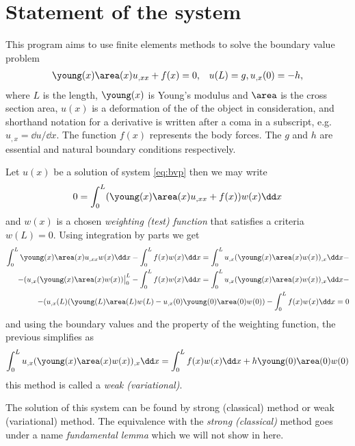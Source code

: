 \documentclass[twoside,a4paper,12pt]{article}
\newcommand{\+}[2]{\newcommand#1{{\color{\notcolor}#2}}}
\newcommand{\1}[2]{\newcommand{#1}[1]{{\color{\notcolor}#2}}}
\newcommand{\2}[2]{\newcommand{#1}[2]{{\color{\notcolor}#2}}}
\begin{document}
\section{Statement of the system}

This program aims to use finite elements methods to solve the boundary
value problem
%
\begin{align}
  \young(x) \area(x) u_{,xx} + f(x) = 0, \label{eq:bvp}
  &&u(L) = g, u_{,x}(0) = -h,
\end{align}
where $L$ is the length, $\young(x)$ is Young's modulus and $\area$ is
the cross section area, $u(x)$ is a deformation of the of the object
in consideration, and shorthand notation for a derivative is written
after a coma in a subscript, e.g. $u_{,x} = \dd u /\dd x$.  The
function $f(x)$ represents the body forces. The $g$ and $h$ are
essential and natural boundary conditions respectively.

Let $u(x)$ be a solution of system \eqref{eq:bvp} then we may write
%
\begin{align}
  0 = \int_0^L (\young(x) \area(x) u_{,xx} + f(x)) w(x) \dd x 
\end{align}
and $w(x)$ is a chosen \emph{weighting (test) function} that satisfies a
criteria $w(L)=0$.
%
Using integration by parts we get
%
\begin{align}
  \int_0^L \young(x) \area(x) u_{,xx} w(x) \dd x 
  -\int_0^L f(x) w(x) \dd x  =
   \int_0^L u_{,x} (\young(x) \area(x) w(x))_{,x} \dd x -\nonumber \\ -
  (u_{,x} (\young(x) \area(x)  w(x))\big|_0^L -
  \int_0^L f(x) w(x) \dd x =  
  \int_0^L u_{,x} (\young(x) \area(x) w(x))_{,x} \dd x -\nonumber \\ -
  (u_{,x}(L) (\young(L) \area(L)  w(L) -
  u_{,x}(0) \young(0) \area(0)  w(0)) 
  -\int_0^L f(x) w(x) \dd x = 0
\end{align}
%
and using the boundary values and the property of the weighting
function, the previous simplifies as
%
\begin{align}
  \int_0^L u_{,x} (\young(x) \area(x) w(x))_{,x} \dd x =  
  \int_0^L f(x) w(x) \dd x + h \young(0) \area(0)  w(0)
  \label{eq:weak-exact}
\end{align}
%
this method is called a \emph{weak (variational)}.

The solution of this system can be found by strong (classical) method
or weak (variational) method. The equivalence with the \emph{strong
  (classical)} method goes under a name \emph{fundamental lemma} which we will not show in here.
\end{document}
